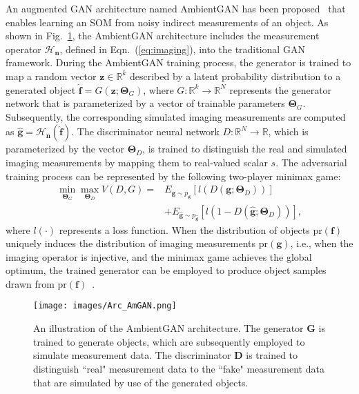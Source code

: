 \documentclass[journal]{IEEEtran}
\renewcommand{\vec}[1]{\mathbf{#1}}
\begin{document}
An augmented GAN architecture named AmbientGAN has been proposed~\cite{bora2018ambientgan}
that enables learning an SOM from noisy indirect measurements of an object.
As shown in Fig.~\ref{fig:arc_AGAN}, the AmbientGAN architecture includes
 the measurement operator  $\mathcal{H}_{\vec{n}}$, defined in Eqn.\ (\ref{eq:imaging}),
 into the traditional GAN framework.
During the AmbientGAN training process,
the generator is trained to map a random vector $\mathbf{z} \in \mathbb{R}^{k}$ described by a latent probability distribution to a generated object
$\hat{\mathbf{f}} = G(\mathbf{z}; \mathbf{\Theta}_{G})$, 
where $G: \mathbb{R}^{k} \rightarrow \mathbb{R}^N$ represents the generator network
 that is parameterized by a vector of trainable parameters $\mathbf{\Theta}_G$.
Subsequently, the corresponding simulated imaging measurements are computed as
 $\hat{\vec{g}} = \mathcal{H}_\vec{n}(\hat{\vec{f}})$.
The discriminator neural network $D: \mathbb{R}^{N} \rightarrow \mathbb{R}$,
which is parameterized  by the vector $\mathbf{\Theta}_D$,
is trained to distinguish the real and simulated imaging measurements by mapping them to real-valued scalar $s$.
The adversarial training process 
 can be represented by the following two-player minimax game\cite{goodfellow2014generative}:
%
\begin{equation} \label{eq:AGAN}
\begin{split}
\min_{\mathbf{\Theta}_G} \max_{\mathbf{\Theta}_D} V(D,G) = & {E_{\vec{g}\sim p_{\vec{g}}}} [l\left(D(\vec{g}; \mathbf{\Theta}_D)\right)]\\
 &+ {E_{\hat{\vec{g}} \sim p_{\hat{\vec{g}}}}} [l(1- D\left( \hat{\vec{g}}; \mathbf{\Theta}_D \right) )],
\end{split}
\end{equation}
%
where $l(\cdot)$ represents a loss function.  
When the distribution of objects $\mathrm{pr}(\vec{f})$ uniquely
 induces the distribution of imaging measurements $\mathrm{pr}(\vec{g})$, i.e., when the 
imaging operator is injective, and the minimax game achieves the global optimum, 
the trained generator can be employed to produce object samples drawn from $\mathrm{pr}(\vec{f})$~\cite{goodfellow2014generative, bora2018ambientgan}.   
\begin{figure}[t]
\centering
\texttt{[image: images/Arc\_AmGAN.png]}
\caption{An illustration of the AmbientGAN architecture. The generator $\mathbf{G}$ is trained to generate objects, which are subsequently employed to simulate measurement data. The discriminator $\mathbf{D}$ is trained to distinguish ``real" measurement data to the ``fake" measurement data that are simulated by use of the generated objects.}
\label{fig:arc_AGAN}
\vspace{-0.3cm}
\end{figure}
\end{document}

